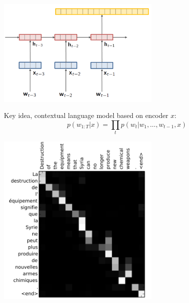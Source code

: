 \documentclass{beamer}
\let\tempone\itemize
\let\temptwo\enditemize
\renewenvironment{itemize}{\tempone\addtolength{\itemsep}{0.5\baselineskip}}{\temptwo}
\newcommand{\air}{\vspace{0.25cm}}
\begin{document}
\begin{frame}
  \begin{center}
  \end{center}
    \air 
   
    \begin{center}
      \includegraphics[width=0.6\textwidth]{rnnlm6}
    \end{center}
  \begin{itemize}
  \item Key idea, contextual language model based on encoder $x$: 
  \end{itemize}
  \[ p(w_{1:T} | x) = \prod_{t} p(w_t | w_1, \ldots, w_{t-1}, x) \] 
  
\end{frame}

\begin{frame}
  \begin{center}
    \includegraphics[width=0.6\textwidth]{attenalign}
  \end{center}
\end{frame}
\end{document}
